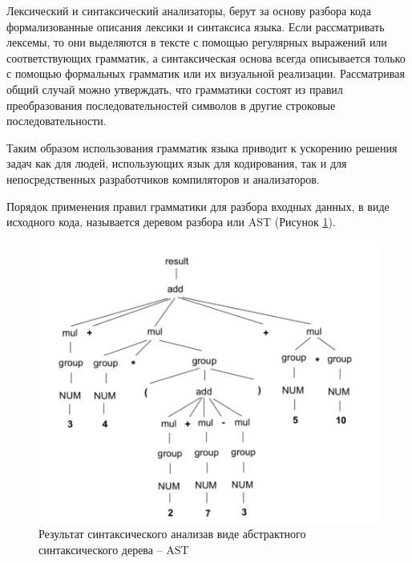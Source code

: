 Лексический и синтаксический анализаторы, берут за основу разбора кода формализованные описания лексики и синтаксиса языка. 
Если рассматривать лексемы, то они выделяются в тексте с помощью регулярных выражений или соответствующих грамматик, а синтаксическая основа всегда описывается только с помощью формальных грамматик или их визуальной реализации. Рассматривая общий случай можно утверждать, что грамматики состоят из правил преобразования последовательностей символов в другие строковые последовательности. 

Таким образом использования грамматик языка приводит к ускорению решения задач как для людей, использующих язык для кодирования, так и для непосредственных разработчиков компиляторов и анализаторов.

Порядок применения правил грамматики для разбора
входных данных, в виде исходного кода, называется деревом разбора или AST (Рисунок \ref{fig:2}). 

\begin{figure}
    \center
    \includegraphics[width=15cm]{Images/ASP treea.png}
    \caption{Результат синтаксического анализав виде абстрактного синтаксического дерева – AST }
    \label{fig:2}
\end{figure}


